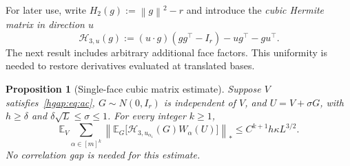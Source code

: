 \documentclass[11pt,letterpaper]{article}
\newtheorem{proposition}{Proposition}
\theoremstyle{remark}
\newcommand{\E}{\mathbb E}
\newcommand{\norm}[1]{\left\lVert#1\right\rVert}
\begin{document}
For later use, write $H_2(g):=\norm g^2-r$ and introduce the
\emph{cubic Hermite matrix in direction $u$}
\begin{equation}
 \mathcal H_{3,u}(g):=(u\cdot g)(gg^\top-I_r)-ug^\top-gu^\top.
 \label{hgap:eq:H3}
\end{equation}
The next result includes arbitrary additional face factors. This
uniformity is needed to restore derivatives evaluated at translated bases.

\begin{proposition}[Single-face cubic matrix estimate]\label{hgap:prop:cubic}
Suppose $V$ satisfies~\eqref{hgap:eq:ac}, $G\sim N(0,I_r)$ is
independent of $V$, and $U=V+\sigma G$, with
$h\ge\delta$ and $\delta\sqrt L\le\sigma\le1$.
For every integer $k\ge1$,
\begin{equation}
 \E_V\sum_{\alpha\in[m]^k}
 \left\|\E_G\bigl[\mathcal H_{3,u_{\alpha_1}}(G)
                    W_\alpha(U)\bigr]\right\|_*
 \le C^{k+1}h\kappa L^{3/2}.
 \label{hgap:eq:cubic-matrix}
\end{equation}
No correlation gap is needed for this estimate.
\end{proposition}
\end{document}
